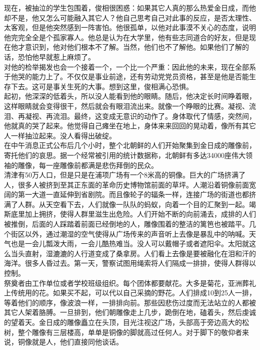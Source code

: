 \begin{multicols}{\theparacolNo}
现在，被抽泣的学生包围着，俊相很困惑：如果其它人真的那么热爱金日成，而他却不是，他又怎么可能融入其它人？他自己思考自己对此事的反应，是否太理性、太客观，但是他突然感到一阵害怕。他很孤单，以他对此事漠不关心的态度，说明他完完全全是个孤家寡人。他总是认为在大学里，他有些志同道合的好友，但是现在他才意识到，他对他们根本不了解。当然，他们也不了解他。如果他们了解的话，恐怕他早就惹上麻烦了。\\

对他的检举揭发也会一个接着一个，一个比一个严重：因此他的未来，现在全部系于他哭的能力上了。不仅仅是事业前途，还有劳动党党员资格，甚至是他是否能生存下去。这可是事关生死的大事。想到这里，俊相满心恐惧。\\

起初，他深深的低着头，所以没人能看到他的眼睛。随后，他决定长时间睁着眼，这样眼睛就会变得很干，然后就会有眼泪流出来。就像一个睁眼的比赛。凝视、流泪、再凝视、再流泪。最终，这变成无意识的动作了。身体取代了情感，突然间，他就真的哭了起来。他觉得自己瘫坐在地上，身体来来回回的晃动着，像所有其它人一样抽泣起来。没人看得出破绽。\\

在中午消息正式公布后几个小时，整个北朝鲜的人们开始聚集到金日成的雕像前，寄托他们的哀思。据一个经常被引用的统计数据称，北朝鲜有多达34000座伟大领袖的雕像，每一座雕像前都满是悲伤拜倒的民众。\\

清津有50万人口，但是只是在浦项广场有一个8米高的铜像。巨大的广场挤满了人，很多人被挤到至其正东面的革命历史博物馆前面的草坪。人潮沿着铜像前面宽阔的第一大道一直延伸到省剧院。而且像轮子的辐条一样，连接广场的街道也都挤满了人群。从天空看下去，人们就像一队队的蚂蚁，向着一个目的汇聚到一起。竭斯底里加上拥挤，使得人群里滋生出危险。人们开始不断的向前涌去，成排的人们被推倒，后面的人踩踏着前面已经倒地的人，雕像围着的整洁的篱笆也被踏平。几个街区以外，通过潮湿的空气使得从广场传来的声音听上去像是暴乱中的呐喊。天气也是一会儿瓢泼大雨，一会儿酷热难当。没人可以戴帽子或者遮阳伞。太阳就这么当头直射，湿漉漉的人行道变成了桑拿房。人们看上去像是要被融化在泪和汗的海洋。很多人昏过去。第一天，警察试图用绳索将人们隔成一排排，使得人群得以控制。\\

祭奠者由工作单位或者学校班级组织。每个团体都要献花。大多是菊花，亚洲葬礼上传统用的花。如果买不起，可以代以自己采摘的野花。人们排成10到25人一排，等着他们的顺序，像波浪一样，一排排向前。那些因悲伤过度而无法站立的人都被其它人架着胳膊。一旦排到，他们朝雕像走上几步，跪倒在地，磕着头，然后虔诚的望着天。金日成的雕像矗立在头顶，目光注视这广场，头部高于旁边高大的松树，整个雕像有三层楼高，单单是铜像的脚就高过任何人。对于脚下的敬仰者来说，铜像就是人，他们直接同他谈话。\\


\end{multicols}
